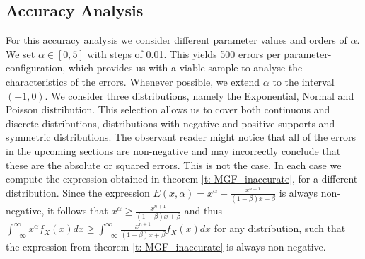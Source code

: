 \subsection{Accuracy Analysis}\label{ss:accuracy_analysis}
For this accuracy analysis we consider different parameter values and orders of \(\alpha\). We set \(\alpha \in [0, 5]\) with steps of 0.01. This yields 500 errors per parameter-configuration, which provides us with a viable sample to analyse the characteristics of the errors. Whenever possible, we extend \(\alpha\) to the interval \((-1, 0)\). We consider three distributions, namely the Exponential, Normal and Poisson distribution. This selection allows us to cover both continuous and discrete distributions, distributions with negative and positive supports and symmetric distributions.
The observant reader might notice that all of the errors in the upcoming sections are non-negative and may incorrectly conclude that these are the absolute or squared errors. This is not the case. In each case we compute the expression obtained in theorem \ref{t: MGF_inaccurate}, for a different distribution. Since the expression \(E(x, \alpha) = x^\alpha - \displaystyle \frac{x^{n+1} }{(1 - \beta)x + \beta}\) is always non-negative, it follows that \( \displaystyle x^\alpha \geq \frac{x^{n+1} }{(1 - \beta)x + \beta}\) and thus \(\displaystyle \int_{-\infty}^{\infty} x^\alpha  f_X(x) dx \geq  \displaystyle \int_{-\infty}^{\infty}  \frac{x^{n+1} }{(1 - \beta)x + \beta} f_X(x) dx\) for any distribution, such that the expression from theorem \ref{t: MGF_inaccurate} is always non-negative.
